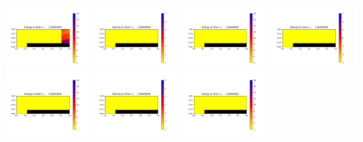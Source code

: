 \documentclass[11pt]{article}
\begin{document}
\includegraphics[width=0.2375\textwidth]{frame0007fig2.png}
\vskip 10pt 
\includegraphics[width=0.2375\textwidth]{frame0008fig0.png}
\includegraphics[width=0.2375\textwidth]{frame0008fig2.png}
\includegraphics[width=0.2375\textwidth]{frame0009fig0.png}
\includegraphics[width=0.2375\textwidth]{frame0009fig2.png}
\vskip 10pt 
\includegraphics[width=0.2375\textwidth]{frame0010fig0.png}
\includegraphics[width=0.2375\textwidth]{frame0010fig2.png}
\end{document}
